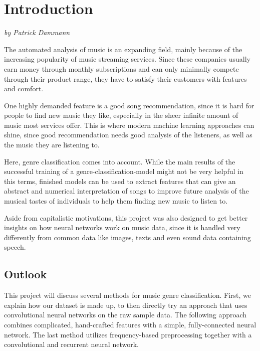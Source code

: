 \chapter{Introduction}
\textit{by Patrick Dammann}

\bigskip

The automated analysis of music is an expanding field, mainly because of the increasing popularity of music streaming services. Since these companies usually earn money through monthly subscriptions and can only minimally compete through their product range, they have to satisfy their customers with features and comfort.

One highly demanded feature is a good song recommendation, since it is hard for people to find new music they like, especially in the sheer infinite amount of music most services offer. This is where modern machine learning approaches can shine, since good recommendation needs good analysis of the listeners, as well as the music they are listening to.

Here, genre classification comes into account. While the main results of the successful training of a genre-classification-model might not be very helpful in this terms, finished models can be used to extract features that can give an abstract and numerical interpretation of songs to improve future analysis of the musical tastes of individuals to help them finding new music to listen to.

Aside from capitalistic motivations, this project was also designed to get better insights on how neural networks work on music data, since it is handled very differently from common data like images, texts and even sound data containing speech.

\section{Outlook}

This project will discuss several methods for music genre classification. First, we explain how our dataset is made up, to then directly try an approach that uses convolutional neural networks on the raw sample data. The following approach combines complicated, hand-crafted features with a simple, fully-connected neural network. The last method utilizes frequency-based preprocessing together with a convolutional and recurrent neural network.